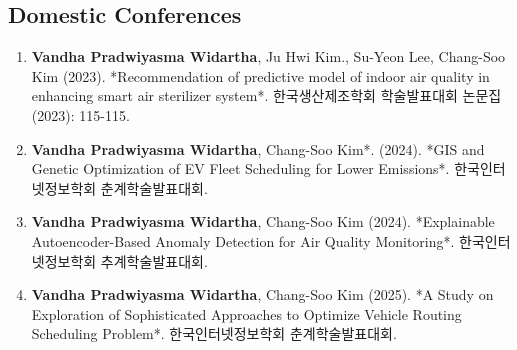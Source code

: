 \subsection{Domestic Conferences}
\begin{enumerate}
  \item \textbf{Vandha Pradwiyasma Widartha}, Ju Hwi Kim., Su-Yeon Lee, Chang-Soo Kim (2023). *Recommendation of predictive model of indoor air quality in enhancing smart air sterilizer system*. 한국생산제조학회 학술발표대회 논문집 (2023): 115-115.

  \item \textbf{Vandha Pradwiyasma Widartha}, Chang-Soo Kim*. (2024). *GIS and Genetic Optimization of EV Fleet Scheduling for Lower Emissions*. 한국인터넷정보학회 춘계학술발표대회. 

  \item \textbf{Vandha Pradwiyasma Widartha}, Chang-Soo Kim (2024). *Explainable Autoencoder-Based Anomaly Detection for Air Quality Monitoring*. 한국인터넷정보학회 추계학술발표대회.

  \item \textbf{Vandha Pradwiyasma Widartha}, Chang-Soo Kim (2025). *A Study on Exploration of Sophisticated Approaches to Optimize Vehicle Routing Scheduling Problem*. 한국인터넷정보학회 춘계학술발표대회.
  
\end{enumerate}
